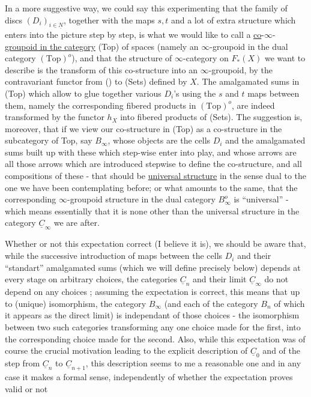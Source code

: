 In a more suggestive way, we could say  this experimenting that the family of discs $(D_i)_{i\in\underline{N}}$, together with the maps $s,t$ and a lot of extra structure which enters into the picture step by step, is what we would like to call a \uline{co}-$\infty$-\uline{groupoid in the category} (Top) of  spaces (namely an $\infty$-groupoid in the dual category $(\mathrm{Top})^o$), and that the structure of $\infty$-category on $F_*(X)$ we want to describe is the transform of this co-structure into an $\infty$-groupoid, by the contravariant functor from () to (Sets) defined by $X$. The  amalgamated sums in (Top) which allow to glue together  various $D_i$'s using the $s$ and $t$ maps between them, namely the corresponding fibered products in $(\mathrm{Top})^o$, are indeed transformed by the functor $h_X$ into fibered products of (Sets).
The suggestion is, moreover, that if we view our co-structure in (Top) as a co-structure in the subcategory of Top, say $B_\infty$, whose objects are the cells $D_i$ and the amalgamated sums built up with these which step-wise enter into play, and whose arrows are all those arrows which are introduced stepwise to define the co-structure, and all compositions of these - that  should be \uline{ universal structure} in the sense dual to the one we have been contemplating before; or what amounts to  the same, that the corresponding $\infty$-groupoid structure in the dual category $B_\infty^o$ is ``universal'' - which means essentially that it is none other than the universal structure in the category $\underline{C}_\infty$ we are after.

Whether or not this expectation  correct (I believe it is\handwritten{$^{*}$}), we should
be aware that, while the successive introduction of maps between the cells $D_i$ and their ``standart'' amalgamated sums (which we will define precisely below) depends at every stage on arbitrary choices, the categories $\underline{C}_n$ and their limit $\underline{C}_\infty$ do not depend on any  choices ; assuming the expectation is correct, this means that up to (unique) isomorphism, the category $B_\infty$ (and each of the category $B_n$ of which it appears as the direct limit) is independant of those choices - the isomorphism between two such categories transforming any one choice made for the first, into the corresponding choice made for the second. Also, while this expectation was of course the crucial motivation leading to the explicit description of $\underline{C}_0$ and of the  step from $\underline{C}_n$ to $\underline{C}_{n+1}$, this description seems to me a reasonable one and in any case it makes a formal sense,  independently of whether the expectation proves valid or not

